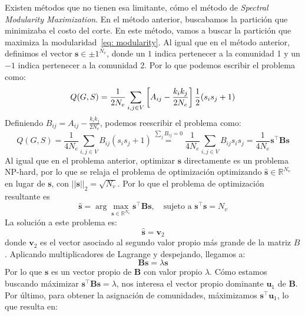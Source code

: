 \documentclass{article}
\begin{document}
Existen métodos que no tienen esa limitante, cómo el método de \emph{Spectral Modularity Maximization}. En el método anterior, buscabamos la partición que minimizaba el costo del corte. En este método, vamos a buscar la partición que maximiza la modularidad~\eqref{eq: modularity}. Al igual que en el método anterior, definimos el vector $\mathbf{s}\in{\pm 1}^{N_v}$, donde un $1$ indica pertenecer a la comunidad 1 y un $-1$ indica pertenecer a la comunidad 2. Por lo que podemos escribir el problema como:
\begin{equation*}
    Q(G, S) = \frac{1}{2N_e} \sum_{i,j\in V}\left[A_{ij} - \frac{k_i k_j}{2N_e}\right] \frac{1}{2}(s_is_j + 1) \\
\end{equation*}
Definiendo $B_{ij} = A_{ij} - \frac{k_i k_j}{2N_e}$, podemos reescribir el problema como:
\begin{equation*}
    Q(G, S) = \frac{1}{4N_e} \sum_{i,j\in V}B_{ij}(s_is_j + 1) \stackrel{\sum_jB_{ij} = 0}{=} \frac{1}{4N_e} \sum_{i,j\in V}B_{ij}s_is_j = \frac{1}{4N_e} \mathbf{s}^\top \mathbf{B} \mathbf{s}
\end{equation*}
Al igual que en el problema anterior, optimizar $\mathbf{s}$ directamente es un problema NP-hard, por lo que se relaja el problema de optimización optimizando $\mathbf{\hat{s}} \in \mathbb{R}^{N_v}$ en lugar de $\mathbf{s}$, con $||\mathbf{s}||_2 = \sqrt{N_v}$.
Por lo que el problema de optimización resultante es
\begin{equation*}
    \mathbf{\hat{s}} = \arg \max_{\mathbf{s}\in{\mathbb{R}}^{N_v}} \mathbf{s}^\top \mathbf{B} \mathbf{s}, \quad \text{sujeto a } \mathbf{s}^\top \mathbf{s} = N_v
\end{equation*}
La solución a este problema es:
\begin{equation*}
    \mathbf{\hat{s}} = \mathbf{v}_2
\end{equation*}
donde $\mathbf{v}_2$ es el vector asociado al segundo valor propio más grande de la matriz $B$. Aplicando multiplicadores de Lagrange y despejando, llegamos a:
\begin{equation*}
    \mathbf{B}\mathbf{s} = \lambda \mathbf{s}
\end{equation*}
Por lo que $\mathbf{s}$ es un vector propio de $\mathbf{B}$ con valor propio $\lambda$. Cómo estamos buscando máximizar $\mathbf{s}^\top \mathbf{B} \mathbf{s} = \lambda$, nos interesa el vector propio dominante $\mathbf{u}_1$ de $\mathbf{B}$. Por último, para obtener la asignación de comunidades, máximizamos $\mathbf{s}^\top \mathbf{u}_1$, lo que resulta en:
\end{document}
